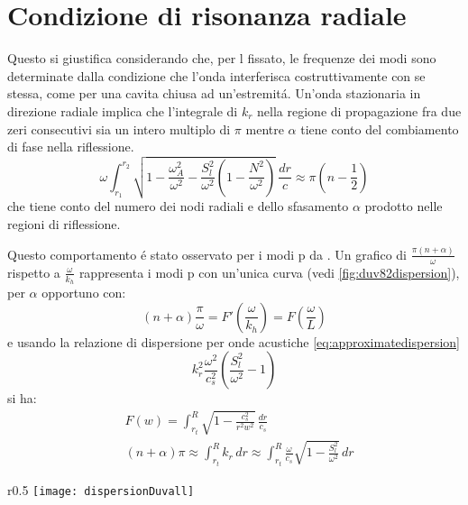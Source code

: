 \documentclass[../main.tex]{subfiles}
\begin{document}
\section{Condizione di risonanza radiale}

Questo si giustifica considerando che, per l fissato, le frequenze dei modi sono determinate dalla condizione che l'onda interferisca costruttivamente con se stessa, come per una cavita chiusa ad un'estremit\'a. Un'onda stazionaria in direzione radiale implica che l'integrale di $k_r$ nella regione di propagazione fra due zeri consecutivi sia un intero multiplo di $\pi$ mentre $\alpha$ tiene conto del combiamento di fase nella riflessione.
\begin{equation}
\omega\int_{r_1}^{r_2}\sqrt{1-\frac{\omega_A^2}{\omega^2}-\frac{S_l^2}{\omega^2}(1-\frac{N^2}{\omega^2})}\,\frac{dr}{c}\approx\pi(n-\frac{1}{2})\label{eq:JWKBmode}
\end{equation}
che tiene conto del numero dei nodi radiali e dello sfasamento $\alpha$ prodotto nelle regioni di riflessione.

Questo comportamento \'e stato osservato per i modi p da \citet{duv82dispersion}. Un grafico di $\frac{\pi(n+\alpha)}{\omega}$ rispetto a $\frac{\omega}{k_h}$ rappresenta i modi p con un'unica curva (vedi \ref{fig:duv82dispersion}), per $\alpha$ opportuno con:
\begin{equation}
(n+\alpha)\frac{\pi}{\omega}=F'(\frac{\omega}{k_h})=F(\frac{\omega}{L})\label{eq:duvallr}
\end{equation}
e usando la relazione di dispersione per onde acustiche \eqref{eq:approximatedispersion}
\begin{equation}
k_r^2\frac{\omega^2}{c_s^2}(\frac{S_l^2}{\omega^2}-1)
\end{equation}
si ha:
\begin{align}
&F(w)=\int_{r_t}^R\sqrt{1-\frac{c_s^2}{r^2w^2}}\,\frac{dr}{c_s}\label{eq:duvallf}\\
&(n+\alpha)\pi\approx\int_{r_t}^Rk_r\,dr\approx\int_{r_t}^R\frac{\omega}{c_s}\sqrt{1-\frac{S_l^2}{\omega^2}}\,dr\label{eq:duvallexpli}
\end{align}

\begin{wrapfigure}[21]{r}{0.5\textwidth}
\centering
\texttt{[image: dispersionDuvall]}
\caption{I modi p sono rappresentati in un unica linea. Da \cite{duv82dispersion}.}\label{fig:duv82dispersion}
\end{wrapfigure}
\end{document}
